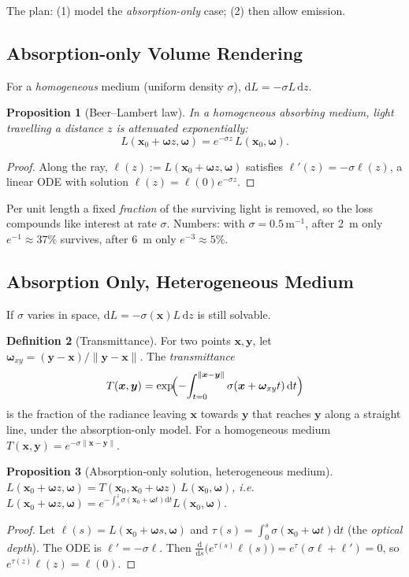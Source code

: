 \documentclass[11pt,a4paper]{article}
\newcommand{\dd}{\,\mathrm{d}}
\newcommand{\x}{{\bm{x}}}
\newcommand{\y}{\bm{y}}
\newcommand{\w}{{\bm{\omega}}}
\theoremstyle{definition}
\newtheorem{definition}{Definition}[section]
\theoremstyle{plain}
\newtheorem{proposition}[definition]{Proposition}
\theoremstyle{remark}
\begin{document}
The plan: (1) model the \emph{absorption-only} case; (2) then allow emission.

\subsection{Absorption-only Volume Rendering}

For a \emph{homogeneous} medium (uniform density $\sigma$), $\mathrm dL=-\sigma L\,\mathrm dz$.

\begin{proposition}[Beer--Lambert law]\label{prop:beer}
In a homogeneous absorbing medium, light travelling a distance $z$ is attenuated exponentially:
\[
L(\x_0+\w z,\w)=e^{-\sigma z}\,L(\x_0,\w).
\]
\end{proposition}
\begin{proof}
Along the ray, $\ell(z):=L(\x_0+\w z,\w)$ satisfies $\ell'(z)=-\sigma\ell(z)$, a linear ODE with solution $\ell(z)=\ell(0)e^{-\sigma z}$.
\end{proof}

\begin{intuition}
Per unit length a fixed \emph{fraction} of the surviving light is removed, so the loss compounds like interest at rate $\sigma$. Numbers: with $\sigma=0.5\,\mathrm m^{-1}$, after 2~m only $e^{-1}\approx 37\%$ survives, after 6~m only $e^{-3}\approx5\%$.
\end{intuition}

\subsection{Absorption Only, Heterogeneous Medium}

If $\sigma$ varies in space, $\mathrm dL=-\sigma(\x)L\,\mathrm dz$ is still solvable.

\begin{definition}[Transmittance]\label{def:transm}
For two points $\x,\y$, let $\w_{xy}=(\y-\x)/\|\y-\x\|$. The \emph{transmittance}
\[
T(\x,\y)=\exp\!\Bigl(-\!\int_{t=0}^{\|\x-\y\|}\sigma(\x+\w_{xy}t)\dd t\Bigr)
\]
is the fraction of the radiance leaving $\x$ towards $\y$ that reaches $\y$ along a straight line, under the absorption-only model. For a homogeneous medium $T(\x,\y)=e^{-\sigma\|\x-\y\|}$.
\end{definition}

\begin{proposition}[Absorption-only solution, heterogeneous medium]\label{prop:hetero}
$L(\x_0+\w z,\w)=T(\x_0,\x_0+\w z)\,L(\x_0,\w)$, i.e.\ $L(\x_0+\w z,\w)=e^{-\int_0^z\sigma(\x_0+\w t)\mathrm dt}L(\x_0,\w)$.
\end{proposition}
\begin{proof}
Let $\ell(s)=L(\x_0+\w s,\w)$ and $\tau(s)=\int_0^s\sigma(\x_0+\w t)\mathrm dt$ (the \emph{optical depth}). The ODE is $\ell'=-\sigma\ell$. Then $\frac{\mathrm d}{\mathrm ds}\bigl(e^{\tau(s)}\ell(s)\bigr)=e^{\tau}(\sigma\ell+\ell')=0$, so $e^{\tau(z)}\ell(z)=\ell(0)$.
\end{proof}
\end{document}
